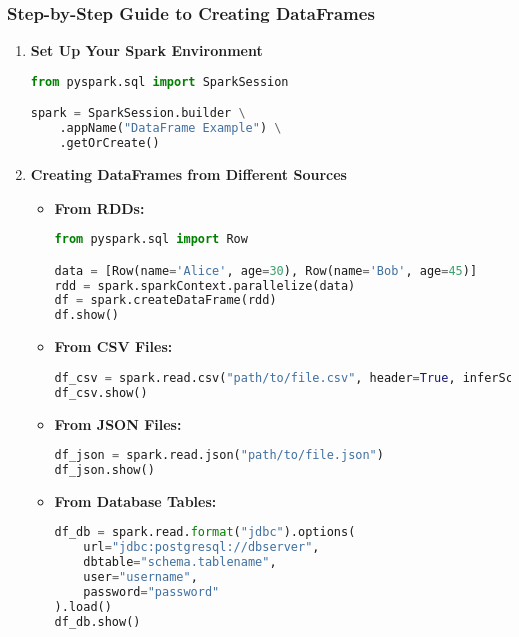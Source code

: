 \documentclass[aspectratio=169]{beamer}
\begin{document}
\begin{frame}[fragile]
    \frametitle{Step-by-Step Guide to Creating DataFrames}
    \begin{enumerate}
        \item \textbf{Set Up Your Spark Environment}
        \begin{lstlisting}[language=Python]
from pyspark.sql import SparkSession

spark = SparkSession.builder \
    .appName("DataFrame Example") \
    .getOrCreate()
        \end{lstlisting}

        \item \textbf{Creating DataFrames from Different Sources}
        \begin{itemize}
            \item \textbf{From RDDs:}
            \begin{lstlisting}[language=Python]
from pyspark.sql import Row

data = [Row(name='Alice', age=30), Row(name='Bob', age=45)]
rdd = spark.sparkContext.parallelize(data)
df = spark.createDataFrame(rdd)
df.show()
            \end{lstlisting}
            
            \item \textbf{From CSV Files:}
            \begin{lstlisting}[language=Python]
df_csv = spark.read.csv("path/to/file.csv", header=True, inferSchema=True)
df_csv.show()
            \end{lstlisting}
            
            \item \textbf{From JSON Files:}
            \begin{lstlisting}[language=Python]
df_json = spark.read.json("path/to/file.json")
df_json.show()
            \end{lstlisting}
            
            \item \textbf{From Database Tables:}
            \begin{lstlisting}[language=Python]
df_db = spark.read.format("jdbc").options(
    url="jdbc:postgresql://dbserver",
    dbtable="schema.tablename",
    user="username",
    password="password"
).load()
df_db.show()
            \end{lstlisting}
        \end{itemize}
    \end{enumerate}
\end{frame}
\end{document}
